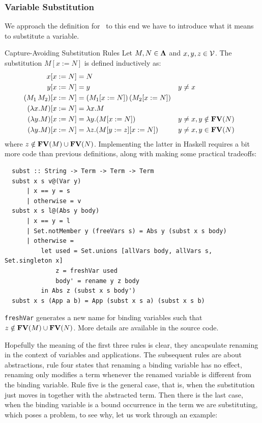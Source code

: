 \subsubsection{\centering Variable Substitution}
We approach the definition for \aequiv \, to this end we have to introduce what it means to substitute a variable.
\begin{definition} Capture-Avoiding Substitution Rules
  Let \( M, N \in \mathbf{\Lambda} \) and \( x, y, z \in \mathcal{V} \). The substitution \( M[x := N] \) is defined inductively as:
  \[
    \begin{aligned}
      x[x := N]                       & = N \\
      y[x := N]                       & = y && y \neq x \\
      (M_1\, M_2)[x := N]             & = (M_1[x := N])\,(M_2[x := N]) \\
      (\lambda x. M)[x := N]          & = \lambda x. M \\
      (\lambda y. M)[x := N]          & = \lambda y. (M[x := N]) && y \neq x, y \notin \mathbf{FV}( N ) \\
      (\lambda y. M)[x := N]          & = \lambda z. (M[y := z][x := N]) && y \neq x, y \in \mathbf{FV}( N )
    \end{aligned}
  \]
  where \( z \notin \mathbf{FV}( M ) \cup \mathbf{FV}( N ) \). Implementing the latter in Haskell requires a bit more code than previous definitions, along with making some practical tradeoffs:
  \begin{verbatim}
  subst :: String -> Term -> Term -> Term
  subst x s v@(Var y)
      | x == y = s
      | otherwise = v
  subst x s l@(Abs y body)
      | x == y = l
      | Set.notMember y (freeVars s) = Abs y (subst x s body)
      | otherwise =
          let used = Set.unions [allVars body, allVars s, Set.singleton x]
              z = freshVar used
              body' = rename y z body
          in Abs z (subst x s body')
  subst x s (App a b) = App (subst x s a) (subst x s b)
\end{verbatim}      
      \begin{note}
        \texttt{freshVar} generates a new name for binding variables such that \( z \notin \mathbf{FV}( M ) \cup \mathbf{FV}( N ) \). More details are available in the source code.
      \end{note}
  \end{definition}
Hopefully the meaning of the first three rules is clear, they ancapsulate renaming in the context of variables and applications. The subsequent rules are about abstractions, rule four states that renaming a binding variable has no effect, renaming only modifies a term whenever the renamed variable is different from the binding variable. Rule five is the general case, that is, when the substitution just moves in together with the abstracted term. Then there is the last case, when the binding variable is a bound occurrence in the term we are substituting, which poses a problem, to see why, let us work through an example:
